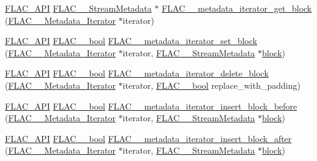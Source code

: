 \begin{DoxyCompactItemize}
\item 
\hyperlink{group__flac__export_ga56ca07df8a23310707732b1c0007d6f5}{F\+L\+A\+C\+\_\+\+A\+PI} \hyperlink{struct_f_l_a_c_____stream_metadata}{F\+L\+A\+C\+\_\+\+\_\+\+Stream\+Metadata} $\ast$ \hyperlink{group__flac__metadata__level2_ga4a2b00a4312d178a9f55c2e2f8b08904}{F\+L\+A\+C\+\_\+\+\_\+metadata\+\_\+iterator\+\_\+get\+\_\+block} (\hyperlink{struct_f_l_a_c_____metadata___iterator}{F\+L\+A\+C\+\_\+\+\_\+\+Metadata\+\_\+\+Iterator} $\ast$iterator)
\item 
\hyperlink{group__flac__export_ga56ca07df8a23310707732b1c0007d6f5}{F\+L\+A\+C\+\_\+\+A\+PI} \hyperlink{ordinals_8h_a95103469f1cbd78b8cf250194985b34e}{F\+L\+A\+C\+\_\+\+\_\+bool} \hyperlink{group__flac__metadata__level2_gab40c33a0bf35a2932a5c13f5230e0d9e}{F\+L\+A\+C\+\_\+\+\_\+metadata\+\_\+iterator\+\_\+set\+\_\+block} (\hyperlink{struct_f_l_a_c_____metadata___iterator}{F\+L\+A\+C\+\_\+\+\_\+\+Metadata\+\_\+\+Iterator} $\ast$iterator, \hyperlink{struct_f_l_a_c_____stream_metadata}{F\+L\+A\+C\+\_\+\+\_\+\+Stream\+Metadata} $\ast$\hyperlink{structblock}{block})
\item 
\hyperlink{group__flac__export_ga56ca07df8a23310707732b1c0007d6f5}{F\+L\+A\+C\+\_\+\+A\+PI} \hyperlink{ordinals_8h_a95103469f1cbd78b8cf250194985b34e}{F\+L\+A\+C\+\_\+\+\_\+bool} \hyperlink{group__flac__metadata__level2_ga18fdaae4986696dc000cae6357810f7b}{F\+L\+A\+C\+\_\+\+\_\+metadata\+\_\+iterator\+\_\+delete\+\_\+block} (\hyperlink{struct_f_l_a_c_____metadata___iterator}{F\+L\+A\+C\+\_\+\+\_\+\+Metadata\+\_\+\+Iterator} $\ast$iterator, \hyperlink{ordinals_8h_a95103469f1cbd78b8cf250194985b34e}{F\+L\+A\+C\+\_\+\+\_\+bool} replace\+\_\+with\+\_\+padding)
\item 
\hyperlink{group__flac__export_ga56ca07df8a23310707732b1c0007d6f5}{F\+L\+A\+C\+\_\+\+A\+PI} \hyperlink{ordinals_8h_a95103469f1cbd78b8cf250194985b34e}{F\+L\+A\+C\+\_\+\+\_\+bool} \hyperlink{group__flac__metadata__level2_ga163c1b4d8fdd72c0d6fb8816b2ae9b18}{F\+L\+A\+C\+\_\+\+\_\+metadata\+\_\+iterator\+\_\+insert\+\_\+block\+\_\+before} (\hyperlink{struct_f_l_a_c_____metadata___iterator}{F\+L\+A\+C\+\_\+\+\_\+\+Metadata\+\_\+\+Iterator} $\ast$iterator, \hyperlink{struct_f_l_a_c_____stream_metadata}{F\+L\+A\+C\+\_\+\+\_\+\+Stream\+Metadata} $\ast$\hyperlink{structblock}{block})
\item 
\hyperlink{group__flac__export_ga56ca07df8a23310707732b1c0007d6f5}{F\+L\+A\+C\+\_\+\+A\+PI} \hyperlink{ordinals_8h_a95103469f1cbd78b8cf250194985b34e}{F\+L\+A\+C\+\_\+\+\_\+bool} \hyperlink{group__flac__metadata__level2_ga2f9d8e02bd2e5ffb235af0b02d347d47}{F\+L\+A\+C\+\_\+\+\_\+metadata\+\_\+iterator\+\_\+insert\+\_\+block\+\_\+after} (\hyperlink{struct_f_l_a_c_____metadata___iterator}{F\+L\+A\+C\+\_\+\+\_\+\+Metadata\+\_\+\+Iterator} $\ast$iterator, \hyperlink{struct_f_l_a_c_____stream_metadata}{F\+L\+A\+C\+\_\+\+\_\+\+Stream\+Metadata} $\ast$\hyperlink{structblock}{block})
\end{DoxyCompactItemize}
